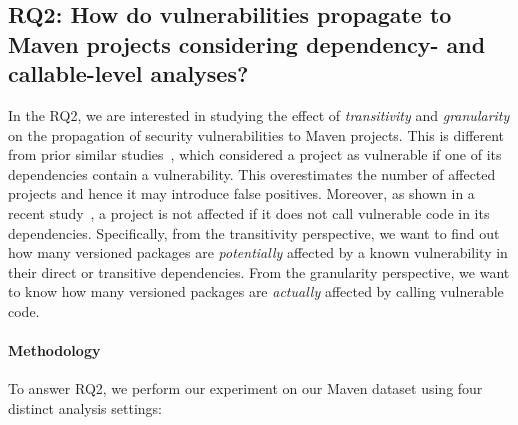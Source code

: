 \subsection{\textbf{RQ2}: How do vulnerabilities propagate to Maven projects considering dependency- and callable-level analyses?}

In the RQ2, we are interested in studying the effect of \textit{transitivity} and \textit{granularity} on the propagation of security vulnerabilities to Maven projects. This is different from prior similar studies~\cite{zimmermann2019small, liu2022demystifying}, which considered a project as vulnerable if one of its dependencies contain a vulnerability. This overestimates the number of affected projects and hence it may introduce false positives. Moreover, as shown in a recent study~\cite{ponta2020detection}, a project is not affected if it does not call vulnerable code in its dependencies. Specifically, from the transitivity perspective, we want to find out how many versioned packages are \textit{potentially} affected by a known vulnerability in their direct or transitive dependencies. From the granularity perspective, we want to know how many versioned packages are \textit{actually} affected by calling vulnerable code.

\paragraph{Methodology}
To answer RQ2, we perform our experiment on our Maven dataset using four distinct analysis settings:

